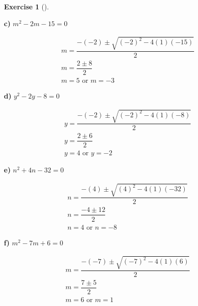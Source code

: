 \documentclass[
  letterpaper,
  DIV=11,
  numbers=noendperiod]{scrreprt}
\theoremstyle{definition}
\newtheorem{exercise}{Exercise}[chapter]
\theoremstyle{remark}
\begin{document}
\begin{exercise}[]
\begin{tcolorbox}
\textbf{c)} \(\displaystyle m^2 - 2m - 15 = 0\)

\begin{align*}
m = \dfrac{-(-2) \pm \sqrt{(-2)^2 - 4(1)(-15)}}{2} \\ m = \dfrac{2 \pm 8}{2} \\ m = 5 \text{ or } m = -3
\end{align*}

\textbf{d)} \(\displaystyle y^2 - 2y - 8 = 0\)

\begin{align*}
y = \dfrac{-(-2) \pm \sqrt{(-2)^2 - 4(1)(-8)}}{2} \\ y = \dfrac{2 \pm 6}{2} \\ y = 4 \text{ or } y = -2
\end{align*}

\textbf{e)} \(\displaystyle n^2 + 4n - 32 = 0\)

\begin{align*}
n = \dfrac{-(4) \pm \sqrt{(4)^2 - 4(1)(-32)}}{2} \\ n = \dfrac{-4 \pm 12}{2} \\ n = 4 \text{ or } n = -8
\end{align*}

\textbf{f)} \(\displaystyle m^2 - 7m + 6 = 0\)

\begin{align*}
m = \dfrac{-(-7) \pm \sqrt{(-7)^2 - 4(1)(6)}}{2} \\ m = \dfrac{7 \pm 5}{2} \\ m = 6 \text{ or } m = 1
\end{align*}

\end{tcolorbox}

\end{exercise}
\end{document}
